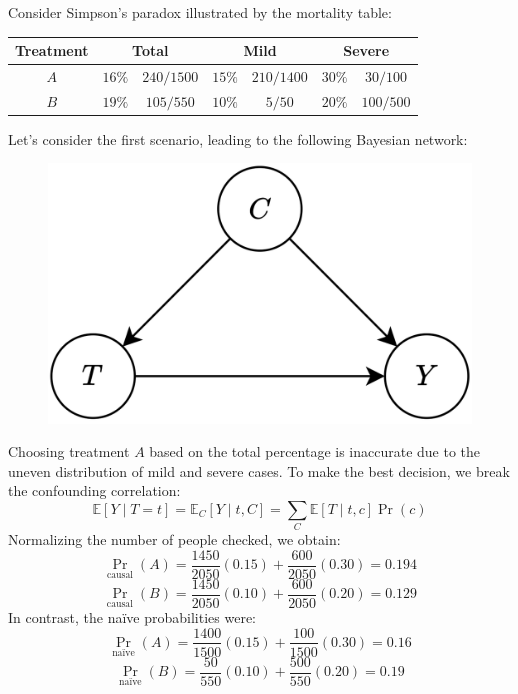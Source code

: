 \begin{example}
    Consider Simpson's paradox illustrated by the mortality table:
    \begin{table}[H]
        \centering
        \begin{tabular}{|c|cc|cccc|}
        \hline
        \textbf{Treatment} & \multicolumn{2}{c|}{\textbf{Total}} & \multicolumn{2}{c}{\textbf{Mild}} & \multicolumn{2}{c|}{\textbf{Severe}} \\ \hline
        $A$                & $16\%$         & $240/1500$         & $15\%$        & $210/1400$        & $30\%$          & $30/100$           \\
        $B$                & $19\%$         & $105/550$          & $10\%$        & $5/50$            & $20\%$          & $100/500$          \\ \hline
        \end{tabular}
    \end{table}
    Let's consider the first scenario, leading to the following Bayesian network:
    \begin{figure}[H]
        \centering
        \includegraphics[width=0.25\linewidth]{images/cau.png}
    \end{figure}
    Choosing treatment $A$ based on the total percentage is inaccurate due to the uneven distribution of mild and severe cases. 
    To make the best decision, we break the confounding correlation:
    \[\mathbb{E}\left[Y\mid T=t\right]=\mathbb{E}_C\left[Y\mid t,C\right]=\sum_C\mathbb{E}\left[ T\mid t,c \right]\Pr(c)\]
    Normalizing the number of people checked, we obtain:
    \[\Pr_{\text{causal}}(A)=\dfrac{1450}{2050}(0.15)+\dfrac{600}{2050}(0.30)=0.194\]
    \[\Pr_{\text{causal}}(B)=\dfrac{1450}{2050}(0.10)+\dfrac{600}{2050}(0.20)=0.129\]
    In contrast, the naïve probabilities were:
    \[\Pr_{\text{naïve}}(A)=\dfrac{1400}{1500}(0.15)+\dfrac{100}{1500}(0.30)=0.16\]
    \[\Pr_{\text{naïve}}(B)=\dfrac{50}{550}(0.10)+\dfrac{500}{550}(0.20)=0.19\]
\end{example}